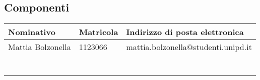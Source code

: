 \subsection*{Componenti}
\begin{table}[H]
	\begin{tabular}{|p{4cm}|l|p{6cm}|}
		\hline
		\textbf{Nominativo}& \textbf{Matricola}  & \textbf{Indirizzo di posta elettronica}  \\ \hline
		Mattia Bolzonella & 1123066  & mattia.bolzonella@studenti.unipd.it   \\ \hline
		&  &   \\ \hline
		&  &   \\ \hline
		&  &   \\ \hline
		&  &   \\ \hline
		&  &   \\ \hline
		&  &   \\ \hline
		&  &   \\ \hline
	\end{tabular}
\end{table}